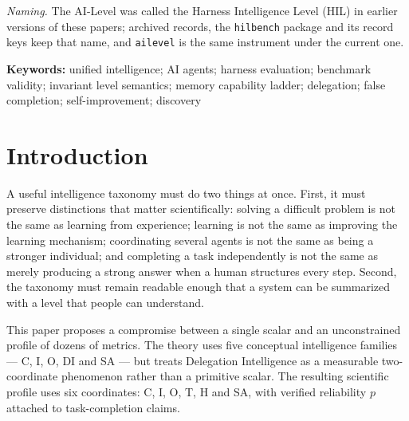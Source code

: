 \begin{abstract}
to 0/12; a delivered-outcome correction restores sensitivity. In a sealed, post-freeze mechanism probe, one executor passed 5/12 instances versus 1/12 for another and had lower RMSE on 11/12 pairs (two-sided sign test $p=0.00635$); the binary comparison was not significant (McNemar $p=0.125$). This discriminates the archived configurations on these instances, not model tiers in general. Auditing also found four answer-key defects and two apparatus defects. We therefore require specification--key tests, cross-tier concordance audits, graded failure modes, per-coordinate headroom, longitudinal evidence, and explicit resource envelopes. The level thresholds remain working definitions requiring broader calibration.
\end{abstract}

\noindent\emph{Naming.} The AI-Level was called the Harness Intelligence Level (HIL) in earlier versions of these papers; archived records, the \texttt{hilbench} package and its record keys keep that name, and \texttt{ailevel} is the same instrument under the current one.

\noindent\textbf{Keywords:} unified intelligence; AI agents; harness evaluation; benchmark validity; invariant level semantics; memory capability ladder; delegation; false completion; self-improvement; discovery

\tableofcontents
\bigskip

\section{Introduction}

A useful intelligence taxonomy must do two things at once. First, it must preserve distinctions that matter scientifically: solving a difficult problem is not the same as learning from experience; learning is not the same as improving the learning mechanism; coordinating several agents is not the same as being a stronger individual; and completing a task independently is not the same as merely producing a strong answer when a human structures every step. Second, the taxonomy must remain readable enough that a system can be summarized with a level that people can understand.

This paper proposes a compromise between a single scalar and an unconstrained profile of dozens of metrics. The theory uses five conceptual intelligence families --- C, I, O, DI and SA --- but treats Delegation Intelligence as a measurable two-coordinate phenomenon rather than a primitive scalar. The resulting scientific profile uses six coordinates: C, I, O, T, H and SA, with verified reliability $p$ attached to task-completion claims.

